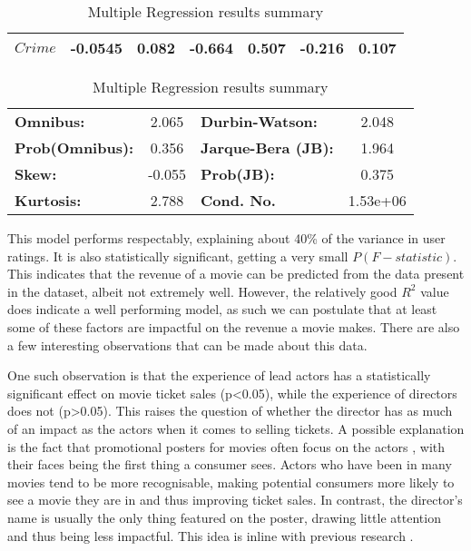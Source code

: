 \begin{table}[H]
\begin{center}
\begin{tabular}{lcccccc}
                \textbf{$Crime$}                &      -0.0545  &        0.082     &    -0.664  &         0.507        &       -0.216    &        0.107     \\
                \bottomrule
            \end{tabular}
            \begin{tabular}{lclc}
                \textbf{Omnibus:}       &  2.065 & \textbf{  Durbin-Watson:     } &    2.048  \\
                \textbf{Prob(Omnibus):} &  0.356 & \textbf{  Jarque-Bera (JB):  } &    1.964  \\
                \textbf{Skew:}          & -0.055 & \textbf{  Prob(JB):          } &    0.375  \\
                \textbf{Kurtosis:}      &  2.788 & \textbf{  Cond. No.          } & 1.53e+06  \\
            \bottomrule
            \end{tabular}
        \end{center}
        
        \caption[short]{Multiple Regression results summary}\label{tab:revenue-ols-summary}
    \end{table}
    This model performs respectably, explaining about  40\% of the variance in user ratings.
    It is also statistically significant, getting a very small  $P(F-statistic)$.
    This indicates that the revenue of a movie can be predicted from the data present in the dataset,
        albeit not extremely well.
    However, the relatively good $R^2$ value does indicate a well performing model, as such
        we can postulate that at least some of these factors are impactful on the revenue a 
        movie makes.
    There are also a few interesting observations that can be made about this data.

    One such observation is that the experience of lead actors has a statistically significant effect
        on movie ticket sales (p<0.05), while the experience of directors does not (p>0.05). 
    This raises the question of whether the director has as much of an impact as the actors when it
        comes to selling tickets.
    A possible explanation is the fact that promotional posters for movies often focus on the
        actors \cite{label}, with their faces being the first thing a consumer sees.
    Actors who have been in many movies tend to be more recognisable, making potential consumers more
        likely to see a movie they are in and thus improving ticket sales.
    In contrast, the director's name is usually the only thing featured on the poster, drawing little
        attention and thus being less impactful.
    This idea is inline with previous research \cite{label}.

